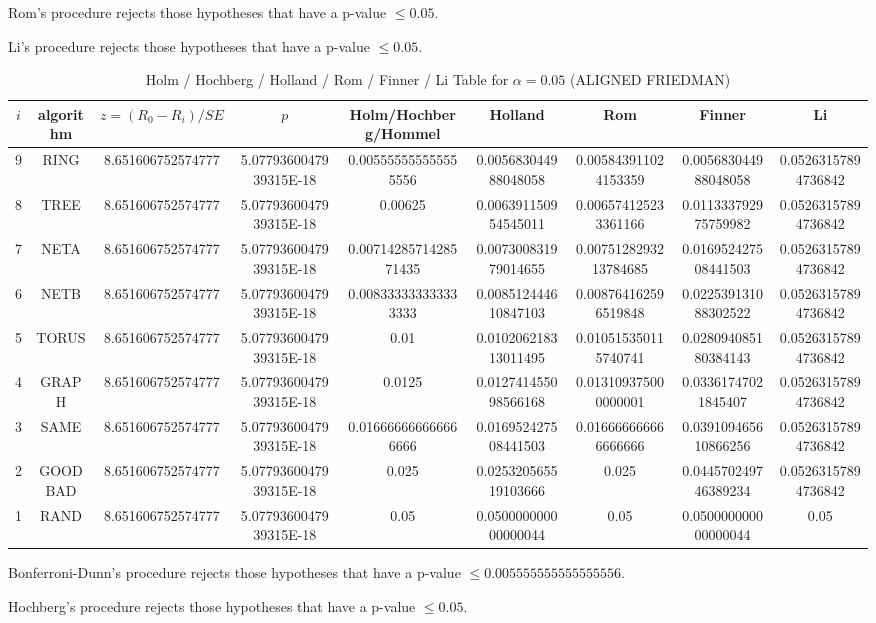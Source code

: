 \documentclass[a4paper,10pt]{article}
\begin{document}
\begin{landscape}
Rom's procedure rejects those hypotheses that have a p-value $\le0.05$.


Li's procedure rejects those hypotheses that have a p-value $\le0.05$.



\newpage

\begin{table}[!htp]
\centering\scriptsize
\caption{Holm / Hochberg / Holland / Rom / Finner / Li Table for $\alpha=0.05$ (ALIGNED FRIEDMAN)}
\begin{tabular}{ccccccccc}
$i$&algorithm&$z=(R_0 - R_i)/SE$&$p$&Holm/Hochberg/Hommel&Holland&Rom&Finner&Li\\
\hline
9& RING&8.651606752574777&5.0779360047939315E-18&0.005555555555555556&0.005683044988048058&0.005843911024153359&0.005683044988048058&0.05263157894736842\\
8& TREE&8.651606752574777&5.0779360047939315E-18&0.00625&0.006391150954545011&0.006574125233361166&0.011333792975759982&0.05263157894736842\\
7& NETA&8.651606752574777&5.0779360047939315E-18&0.0071428571428571435&0.007300831979014655&0.0075128293213784685&0.016952427508441503&0.05263157894736842\\
6& NETB&8.651606752574777&5.0779360047939315E-18&0.008333333333333333&0.008512444610847103&0.008764162596519848&0.022539131088302522&0.05263157894736842\\
5& TORUS&8.651606752574777&5.0779360047939315E-18&0.01&0.010206218313011495&0.010515350115740741&0.028094085180384143&0.05263157894736842\\
4& GRAPH&8.651606752574777&5.0779360047939315E-18&0.0125&0.012741455098566168&0.013109375000000001&0.03361747021845407&0.05263157894736842\\
3& SAME&8.651606752574777&5.0779360047939315E-18&0.016666666666666666&0.016952427508441503&0.016666666666666666&0.039109465610866256&0.05263157894736842\\
2& GOODBAD&8.651606752574777&5.0779360047939315E-18&0.025&0.025320565519103666&0.025&0.044570249746389234&0.05263157894736842\\
1& RAND&8.651606752574777&5.0779360047939315E-18&0.05&0.050000000000000044&0.05&0.050000000000000044&0.05\\
\hline
\end{tabular}
\end{table}
Bonferroni-Dunn's procedure rejects those hypotheses that have a p-value $\le0.005555555555555556$.


Hochberg's procedure rejects those hypotheses that have a p-value $\le0.05$.



\end{landscape}
\end{document}
